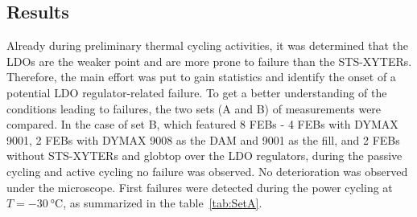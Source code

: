 \subsection{Results}
Already during preliminary thermal cycling activities, it was determined that the \gls{LDO}s are the weaker point and are more prone to failure than the STS-XYTERs. Therefore, the main effort was put to gain statistics and identify the onset of a potential \gls{LDO} regulator-related failure. To get a better understanding of the conditions leading to failures, the two sets (A and B) of measurements were compared. 
In the case of set B, which featured 8 \glspl{FEB} - 4 \glspl{FEB} with DYMAX 9001, 2 \glspl{FEB} with DYMAX 9008 as the DAM and 9001 as the fill, and 2 \glspl{FEB} without STS-XYTERs and globtop over the \gls{LDO} regulators, during the passive cycling and active cycling no failure was observed. No deterioration was observed under the microscope. First failures were detected during the power cycling at $T=\SI{-30}{\celsius}$, as summarized in the table~\ref{tab:SetA}. 
\begin{table}[!h]
\centering
\caption{Detailed description of the \gls{LDO} failure with regard to the type and number of cycles}
\label{tab:SetA}
\end{table}

